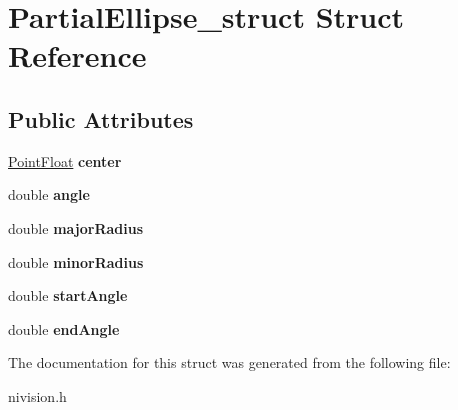 \hypertarget{structPartialEllipse__struct}{
\section{PartialEllipse\_\-struct Struct Reference}
\label{structPartialEllipse__struct}
}
\subsection*{Public Attributes}
\begin{DoxyCompactItemize}
\item 
\hypertarget{structPartialEllipse__struct_af4f93f662719797b8e9b33ab225fee25}{
\hyperlink{structPointFloat__struct}{PointFloat} {\bfseries center}}
\label{structPartialEllipse__struct_af4f93f662719797b8e9b33ab225fee25}

\item 
\hypertarget{structPartialEllipse__struct_a64c54abf4feafac07984f96eaf81f30b}{
double {\bfseries angle}}
\label{structPartialEllipse__struct_a64c54abf4feafac07984f96eaf81f30b}

\item 
\hypertarget{structPartialEllipse__struct_aaa55b5c2e43213ff045cbf292476f4d9}{
double {\bfseries majorRadius}}
\label{structPartialEllipse__struct_aaa55b5c2e43213ff045cbf292476f4d9}

\item 
\hypertarget{structPartialEllipse__struct_a4bb1ab4c082e144415aa76c7cfe4232f}{
double {\bfseries minorRadius}}
\label{structPartialEllipse__struct_a4bb1ab4c082e144415aa76c7cfe4232f}

\item 
\hypertarget{structPartialEllipse__struct_a4bd66da04489796ccddd638c65797014}{
double {\bfseries startAngle}}
\label{structPartialEllipse__struct_a4bd66da04489796ccddd638c65797014}

\item 
\hypertarget{structPartialEllipse__struct_a30bb01c3c3aa195415475d7266f3b22d}{
double {\bfseries endAngle}}
\label{structPartialEllipse__struct_a30bb01c3c3aa195415475d7266f3b22d}

\end{DoxyCompactItemize}


The documentation for this struct was generated from the following file:\begin{DoxyCompactItemize}
\item 
nivision.h\end{DoxyCompactItemize}
